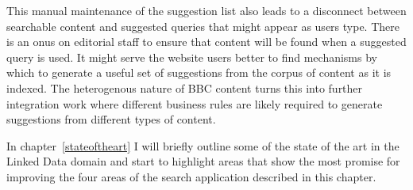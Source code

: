 This manual maintenance of the suggestion list also leads to a
disconnect between searchable content and suggested queries that might
appear as users type. There is an onus on editorial staff to ensure
that content will be found when a suggested query is used. It might
serve the website users better to find mechanisms by which to generate
a useful set of suggestions from the corpus of content as it is
indexed. The heterogenous nature of BBC content turns this into
further integration work where different business rules are likely required
to generate suggestions from different types of content.

In chapter~\ref{stateoftheart} I will briefly outline some of the state of the
art in the Linked Data domain and start to highlight areas that show
the most promise for improving the four areas of the search application
described in this chapter.
